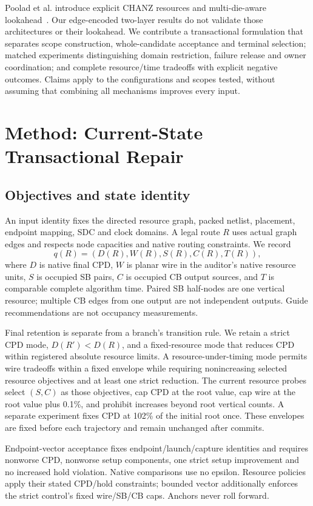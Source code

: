 \documentclass[conference,10pt]{IEEEtran}
\begin{document}
Poolad et al. introduce explicit CHANZ resources and multi-die-aware lookahead~\cite{multidie}. Our edge-encoded two-layer results do not validate those architectures or their lookahead. We contribute a transactional formulation that separates scope construction, whole-candidate acceptance and terminal selection; matched experiments distinguishing domain restriction, failure release and owner coordination; and complete resource/time tradeoffs with explicit negative outcomes. Claims apply to the configurations and scopes tested, without assuming that combining all mechanisms improves every input.
\section{Method: Current-State Transactional Repair}
\subsection{Objectives and state identity}
An input identity fixes the directed resource graph, packed netlist, placement, endpoint mapping, SDC and clock domains. A legal route $R$ uses actual graph edges and respects node capacities and native routing constraints. We record
\begin{equation}
 q(R)=(D(R),W(R),S(R),C(R),T(R)),
\end{equation}
where $D$ is native final CPD, $W$ is planar wire in the auditor's native resource units, $S$ is occupied SB pairs, $C$ is occupied CB output sources, and $T$ is comparable complete algorithm time. Paired SB half-nodes are one vertical resource; multiple CB edges from one output are not independent outputs. Guide recommendations are not occupancy measurements.

Final retention is separate from a branch's transition rule. We retain a strict CPD mode, $D(R')<D(R)$, and a fixed-resource mode that reduces CPD within registered absolute resource limits. A resource-under-timing mode permits wire tradeoffs within a fixed envelope while requiring nonincreasing selected resource objectives and at least one strict reduction. The current resource probes select $(S,C)$ as those objectives, cap CPD at the root value, cap wire at the root value plus 0.1\%, and prohibit increases beyond root vertical counts. A separate experiment fixes CPD at 102\% of the initial root once. These envelopes are fixed before each trajectory and remain unchanged after commits.

Endpoint-vector acceptance fixes endpoint/launch/capture identities and requires nonworse CPD, nonworse setup components, one strict setup improvement and no increased hold violation. Native comparisons use no epsilon. Resource policies apply their stated CPD/hold constraints; bounded vector additionally enforces the strict control's fixed wire/SB/CB caps. Anchors never roll forward.
\end{document}
